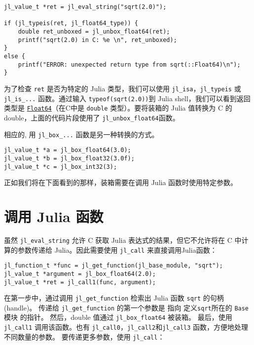 \begin{lstlisting}
jl_value_t *ret = jl_eval_string("sqrt(2.0)");

if (jl_typeis(ret, jl_float64_type)) {
    double ret_unboxed = jl_unbox_float64(ret);
    printf("sqrt(2.0) in C: %e \n", ret_unboxed);
}
else {
    printf("ERROR: unexpected return type from sqrt(::Float64)\n");
}
\end{lstlisting}



为了检查 \texttt{ret} 是否为特定的 Julia 类型，我们可以使用 \texttt{jl\_isa}，\texttt{jl\_typeis} 或 \texttt{jl\_is\_...} 函数。通过输入 \texttt{typeof(sqrt(2.0))}到 Julia shell，我们可以看到返回类型是 \hyperlink{5027751419500983000}{\texttt{Float64}}（在C中是 \texttt{double} 类型）。要将装箱的 Julia 值转换为 C 的double，上面的代码片段使用了 \texttt{jl\_unbox\_float64}函数。



相应的, 用 \texttt{jl\_box\_...} 函数是另一种转换的方式。




\begin{lstlisting}
jl_value_t *a = jl_box_float64(3.0);
jl_value_t *b = jl_box_float32(3.0f);
jl_value_t *c = jl_box_int32(3);
\end{lstlisting}



正如我们将在下面看到的那样，装箱需要在调用 Julia 函数时使用特定参数。



\hypertarget{15001488547709567560}{}


\section{调用 Julia 函数}



虽然 \texttt{jl\_eval\_string} 允许 C 获取 Julia 表达式的结果，但它不允许将在 C 中计算的参数传递给 Julia。因此需要使用 \texttt{jl\_call} 来直接调用Julia函数：




\begin{lstlisting}
jl_function_t *func = jl_get_function(jl_base_module, "sqrt");
jl_value_t *argument = jl_box_float64(2.0);
jl_value_t *ret = jl_call1(func, argument);
\end{lstlisting}



在第一步中，通过调用 \texttt{jl\_get\_function} 检索出 Julia 函数 \texttt{sqrt} 的句柄(handle)。 传递给 \texttt{jl\_get\_function} 的第一个参数是 指向 定义\texttt{sqrt}所在的 \texttt{Base} 模块 的指针。 然后，double 值通过 \texttt{jl\_box\_float64} 被装箱。 最后，使用 \texttt{jl\_call1} 调用该函数。也有 \texttt{jl\_call0}，\texttt{jl\_call2}和\texttt{jl\_call3} 函数，方便地处理不同数量的参数。 要传递更多参数，使用 \texttt{jl\_call}：




